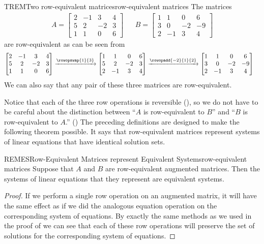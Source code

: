 \begin{example}{TREM}{Two row-equivalent matrices}{row-equivalent matrices}
The matrices
\begin{align*}
A=\begin{bmatrix}
2&-1&3&4\\
5&2&-2&3\\
1&1&0&6
\end{bmatrix}
&&
B=\begin{bmatrix}
1&1&0&6\\
3&0&-2&-9\\
2&-1&3&4
\end{bmatrix}
\end{align*}
are row-equivalent as can be seen from
\begin{align*}
\begin{bmatrix}
2&-1&3&4\\
5&2&-2&3\\
1&1&0&6
\end{bmatrix}
%
\xrightarrow{\rowopswap{1}{3}}
\begin{bmatrix}
1&1&0&6\\
5&2&-2&3\\
2&-1&3&4
\end{bmatrix}
&
%
\xrightarrow{\rowopadd{-2}{1}{2}}
\begin{bmatrix}
1&1&0&6\\
3&0&-2&-9\\
2&-1&3&4
\end{bmatrix}
\end{align*}
We can also say that any pair of these three matrices are row-equivalent.
\end{example}
%
Notice that each of the three row operations is reversible (), so we do not have to be careful about the distinction between ``$A$ is row-equivalent to $B$'' and ``$B$ is row-equivalent to $A$.'' ()
%
The preceding definitions are designed to make the following theorem possible.  It says that row-equivalent matrices represent systems of linear equations that have identical solution sets.
%
\begin{theorem}{REMES}{Row-Equivalent Matrices represent Equivalent Systems}{row-equivalent matrices}
Suppose that $A$ and $B$ are row-equivalent augmented matrices.  Then the systems of linear equations that they represent are equivalent systems.
\end{theorem}
%
\begin{proof}
If we perform a single row operation on an augmented matrix, it will have the same effect as if we did the analogous equation operation on the corresponding system of equations.  By exactly the same methods as we used in the proof of  we can see that each of these row operations will preserve the set of solutions for the corresponding system of equations.
\end{proof}

